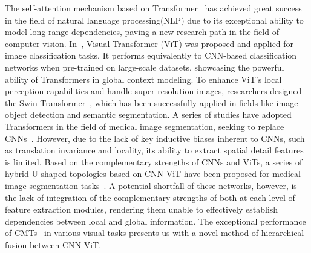 The self-attention mechanism based on Transformer~\cite{vaswani2017attention} has achieved great success in the field of natural language processing(NLP) due to its exceptional ability to model long-range dependencies, paving a new research path in the field of computer vision. In~\cite{dosovitskiy2020image}, Visual Transformer (ViT) was proposed and applied for image classification tasks. It performs equivalently to CNN-based classification networks when pre-trained on large-scale datasets, showcasing the powerful ability of Transformers in global context modeling. To enhance ViT's local perception capabilities and handle super-resolution images, researchers designed the Swin Transformer~\cite{liu2021swin}, which has been successfully applied in fields like image object detection and semantic segmentation. A series of studies have adopted Transformers in the field of medical image segmentation, seeking to replace CNNs~\cite{cao2022swin,huang2022missformer}. However, due to the lack of key inductive biases inherent to CNNs, such as translation invariance and locality, its ability to extract spatial detail features is limited. Based on the complementary strengths of CNNs and ViTs, a series of hybrid U-shaped topologies based on CNN-ViT have been proposed for medical image segmentation tasks~\cite{chen2021transunet,zhang2021transfuse,naderi2022focal,lan2024brau}. A potential shortfall of these networks, however, is the lack of integration of the complementary strengths of both at each level of feature extraction modules, rendering them unable to effectively establish dependencies between local and global information. The exceptional performance of CMTs~\cite{guo2022cmt} in various visual tasks presents us with a novel method of hierarchical fusion between CNN-ViT.


